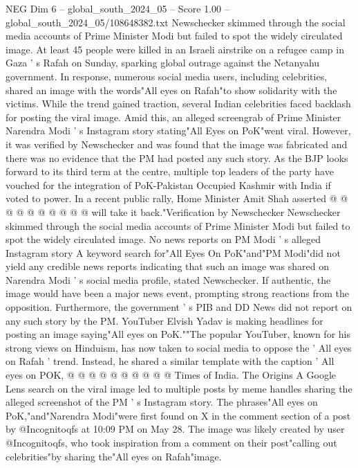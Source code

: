 \begin{textsample}{NEG Dim 6 – global\_south\_2024\_05 – Score 1.00 – global\_south\_2024\_05/108648382.txt}  \label{ex:f6_neg_291}
Newschecker skimmed through the social media accounts of Prime Minister Modi but failed to spot the widely circulated image.
At least 45 people were killed in an Israeli airstrike on a refugee camp in Gaza ' s Rafah on Sunday, sparking global outrage against the Netanyahu government.
In response, numerous social media users, including celebrities, shared an image with the words"All eyes on Rafah"to show solidarity with the victims.
While the trend gained traction, several Indian celebrities faced backlash for posting the viral image.
Amid this, an alleged screengrab of Prime Minister Narendra Modi ' s Instagram story stating"All Eyes on PoK"went viral.
However, it was verified by Newschecker and was found that the image was fabricated and there was no evidence that the PM had posted any such story.
As the BJP looks forward to its third term at the centre, multiple top leaders of the party have vouched for the integration of PoK-Pakistan Occupied Kashmir with India if voted to power.
In a recent public rally, Home Minister Amit Shah asserted @ @ @ @ @ @ @ @ @ @ will take it back."Verification by Newschecker Newschecker skimmed through the social media accounts of Prime Minister Modi but failed to spot the widely circulated image.
No news reports on PM Modi ' s alleged Instagram story A keyword search for"All Eyes On PoK"and"PM Modi"did not yield any credible news reports indicating that such an image was shared on Narendra Modi ' s social media profile, stated Newschecker.
If authentic, the image would have been a major news event, prompting strong reactions from the opposition.
Furthermore, the government ' s PIB and DD News did not report on any such story by the PM.
YouTuber Elvish Yadav is making headlines for posting an image saying"All eyes on PoK.""The popular YouTuber, known for his strong views on Hinduism, has now taken to social media to oppose the ' All eyes on Rafah ' trend.
Instead, he shared a similar template with the caption ' All eyes on POK, @ @ @ @ @ @ @ @ @ @ Times of India.
The Origins A Google Lens search on the viral image led to multiple posts by meme handles sharing the alleged screenshot of the PM ' s Instagram story.
The phrases"All eyes on PoK,"and"Narendra Modi"were first found on X in the comment section of a post by @Incognitoqfs at 10:09 PM on May 28.
The image was likely created by user @Incognitoqfs, who took inspiration from a comment on their post"calling out celebrities"by sharing the"All eyes on Rafah"image.

\end{textsample}
